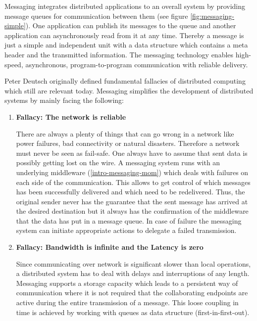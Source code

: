Messaging integrates distributed applications to an overall system by providing
message queues for communication between them (see figure
\ref{fig:messaging-simple}). One application can publish its messages to the
queue and another application can asynchronously read from it at any time.
Thereby a message is just a simple and independent unit with a data structure
which contains a meta header and the transmitted information. The messaging
technology enables high-speed, asynchronous, program-to-program communication
with reliable delivery.

\newpage
Peter Deutsch originally defined fundamental fallacies of distributed computing
which still are relevant today.\cite{fallaciesOfDs} Messaging
simplifies the development of distributed systems by mainly facing the
following:

\begin{enumerate}
    \item{\textbf{Fallacy: The network is reliable}

        There are always a plenty of things that can go wrong in a network like
        power failures, bad connectivity or natural disasters. Therefore a
        network must never be seen as fail-safe. One always have to assume that
        sent data is possibly getting lost on the wire. A messaging system runs
        with an underlying middleware (\ref{intro-messaging-mom}) which deals
        with failures on each side of the communication. This allows to get
        control of which messages has been successfully delivered and which need
        to be redelivered. Thus, the original sender never has the guarantee
        that the sent message has arrived at the desired destination but it
        always has the confirmation of the middleware that the data has put in a
        message queue. In case of failure the messaging system can initiate
        appropriate actions to delegate a failed transmission.

      }

    \item{\textbf{Fallacy: Bandwidth is infinite and the Latency is zero }

        Since communicating over network is significant slower than local
        operations, a distributed system has to deal with delays and
        interruptions of any length. Messaging supports a storage capacity which
        leads to a persistent way of communication where it is not required that
        the collaborating endpoints are active during the entire transmission of
        a message. This loose coupling in time is achieved by working with
        queues as data structure (first-in-first-out).

}
\end{enumerate}
